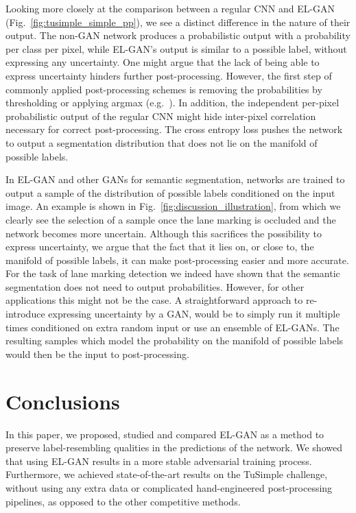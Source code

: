 \documentclass{article} \usepackage{nips13submit_e,times}
\newcommand{\elgan}{\mbox{EL-GAN}}
\begin{document}
Looking more closely at the comparison between a regular CNN and \elgan{} (Fig.~\ref{fig:tusimple_simple_pp}), we see a distinct difference in the nature of their output.
The non-GAN network produces a probabilistic output with a probability per class per pixel, while \elgan{}'s output is similar to a possible label, without expressing any uncertainty.
One might argue that the lack of being able to express uncertainty hinders further post-processing.
However, the first step of commonly applied post-processing schemes is removing the probabilities by thresholding or applying argmax (e.g.~\cite{neven2018towards,pan2017spatial}).
In addition, the independent per-pixel probabilistic output of the regular CNN might hide inter-pixel correlation necessary for correct post-processing. The cross entropy loss pushes the network to output a segmentation distribution that does not lie on the manifold of possible labels.

In \elgan{} and other GANs for semantic segmentation, networks are trained to output a sample of the distribution of possible labels conditioned on the input image.
An example is shown in Fig.~\ref{fig:discussion_illustration}, from which we clearly see the selection of a sample once the lane marking is occluded and the network becomes more uncertain.
Although this sacrifices the possibility to express uncertainty, we argue that the fact that it lies on, or close to, the manifold of possible labels, it can make post-processing easier and more accurate.
For the task of lane marking detection we indeed have shown that the semantic segmentation does not need to output probabilities.
However, for other applications this might not be the case.
A straightforward approach to re-introduce expressing uncertainty by a GAN, would be to simply run it multiple times conditioned on extra random input or use an ensemble of \elgan{}s.
The resulting samples which model the probability on the manifold of possible labels would then be the input to post-processing.



\section{Conclusions}

In this paper, we proposed, studied and compared \elgan{} as a method to preserve label-resembling qualities in the predictions of the network. 
We showed that using \elgan{} results in a more stable adversarial training process. 
Furthermore, we achieved state-of-the-art results on the TuSimple challenge, without using any extra data or complicated hand-engineered post-processing pipelines, as opposed to the other competitive methods.
\end{document}
